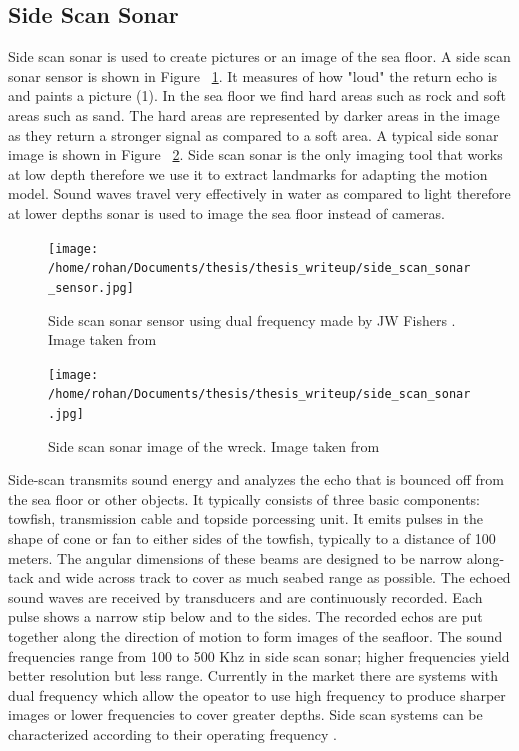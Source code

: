\documentclass[12pt]{dalcsthesis}
\begin{document}
\subsection{Side Scan Sonar} 
Side scan sonar is used to create pictures or an image of the sea floor. A side scan sonar sensor is shown in Figure ~\ref{fig- side scan sonar sensor}. It measures of how "loud" the return echo is and paints a picture (1). In the sea floor we find  hard areas such as rock and soft areas such as sand. The hard areas are represented by darker areas in the image as they return a stronger signal as compared to a soft area. A typical side sonar image is shown in Figure ~\ref{fig- side scan sonar image}. Side scan sonar is the only imaging tool that works at low depth therefore we use it to extract landmarks for adapting the motion model. Sound waves travel very effectively in water as compared to light therefore at lower depths sonar is used to image the sea floor instead of cameras. 
\begin{figure}
  \centering
     {\texttt{[image: /home/rohan/Documents/thesis/thesis\_writeup/side\_scan\_sonar\_sensor.jpg]}}
  \caption{\label{fig- side scan sonar sensor} Side scan sonar sensor using dual frequency made by JW Fishers . Image taken from \cite{side_sonar_fisheries_url}}
\end{figure}

\begin{figure}
  \centering
     {\texttt{[image: /home/rohan/Documents/thesis/thesis\_writeup/side\_scan\_sonar.jpg]}}
  \caption{\label{fig- side scan sonar image} Side scan sonar image of the wreck. Image taken from \cite{side_sonar_url}}
\end{figure}

Side-scan transmits sound energy and analyzes the echo that is bounced off from the sea floor or other objects. It typically consists of three basic components: towfish, transmission cable and topside porcessing unit. It emits pulses in the shape of cone or fan to either sides of the towfish, typically to a distance of 100 meters. The angular dimensions of these beams are designed to be narrow along-tack and wide across track to cover as much seabed range as possible.  The echoed sound waves are received by transducers and are continuously recorded. Each pulse shows a narrow stip below and to the sides.  The recorded echos are put together along the direction of motion to form images of the seafloor. The sound frequencies range from 100 to 500 Khz in side scan sonar; higher frequencies yield better resolution but less range. Currently in the market there are systems with dual frequency which allow the opeator to use high frequency to produce sharper images or lower frequencies to cover greater depths. Side scan 
systems can be characterized according to their operating frequency \cite{side_sonar_usgs_url}.
\end{document}
